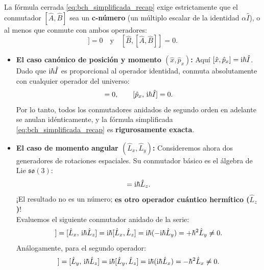 \begin{alertabox}
    La fórmula cerrada \eqref{eq:bch_simplificada_recap} exige estrictamente que el conmutador $[\hat{A}, \hat{B}]$ sea un \textbf{c-número} (un múltiplo escalar de la identidad $\alpha\hat{I}$), o al menos que conmute con ambos operadores:
    \begin{equation}
        [\hat{A}, [\hat{A}, \hat{B}]] = 0 \quad \text{y} \quad [\hat{B}, [\hat{A}, \hat{B}]] = 0.
    \end{equation}
    \begin{itemize}
        \item \textbf{El caso canónico de posición y momento $(\hat{x}, \hat{p}_x)$:}
        Aquí $[\hat{x}, \hat{p}_x] = \mathrm{i}\hbar\hat{I}$. Dado que $\mathrm{i}\hbar\hat{I}$ es proporcional al operador identidad, conmuta absolutamente con cualquier operador del universo:
        \begin{equation}
            [\hat{x}, \, \iu\hbar\hat{I}] = 0, \qquad [\hat{p}_x, \, \iu\hbar\hat{I}] = 0.
        \end{equation}
        Por lo tanto, todos los conmutadores anidados de segundo orden en adelante se anulan idénticamente, y la fórmula simplificada \eqref{eq:bch_simplificada_recap} es \textbf{rigurosamente exacta}.
        \item \textbf{El caso de momento angular $(\hat{L}_x, \hat{L}_y)$:}
        Consideremos ahora dos generadores de rotaciones espaciales. Su conmutador básico es el álgebra de Lie $\mathfrak{so}(3)$:
        \begin{equation}
            [\hat{L}_x, \hat{L}_y] = \iu\hbar\hat{L}_z.
        \end{equation}
        ¡El resultado no es un número; \textbf{es otro operador cuántico hermítico ($\hat{L}_z$)}!\\
        Evaluemos el siguiente conmutador anidado de la serie:
        \begin{equation}
            [\hat{L}_x, [\hat{L}_x, \hat{L}_y]] = [\hat{L}_x, \, \iu\hbar\hat{L}_z] = \iu\hbar[\hat{L}_x, \hat{L}_z] = \iu\hbar(-\iu\hbar\hat{L}_y) = +\hbar^2\hat{L}_y \neq 0.
        \end{equation}
        Análogamente, para el segundo operador:
        \begin{equation}
            [\hat{L}_y, [\hat{L}_x, \hat{L}_y]] = [\hat{L}_y, \, \iu\hbar\hat{L}_z] = \iu\hbar[\hat{L}_y, \hat{L}_z] = \iu\hbar(\iu\hbar\hat{L}_x) = -\hbar^2\hat{L}_x \neq 0.

\end{equation}
\end{itemize}
\end{alertabox}
